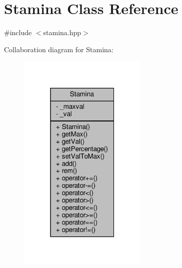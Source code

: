 \hypertarget{classStamina}{}\section{Stamina Class Reference}
\label{classStamina}


{\ttfamily \#include $<$stamina.\+hpp$>$}



Collaboration diagram for Stamina\+:\nopagebreak
\begin{figure}[H]
\begin{center}
\leavevmode
\includegraphics[width=175pt]{classStamina__coll__graph}
\end{center}
\end{figure}
